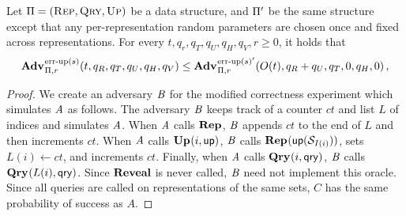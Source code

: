 \begin{lemma}[]\label{lemma:immutabletomutablenew}
  Let $\mathrm{\Pi} = (\textsc{Rep}, \textsc{Qry}, \textsc{Up})$ be a data structure, and $\mathrm{\Pi}'$ be the same structure except that any per-representation random parameters are chosen once and fixed across representations. For every $t, q_r, q_T, q_U, q_H, q_V, r \geq 0$, it holds that
  \[
    \Adv{\errep(s)}_{\struct,r}(t, q_R, q_T, q_U, q_H, q_V) \leq
    \Adv{\errep(s)'}_{\struct,r}(O(t), q_R + q_U, q_T, 0, q_H, 0) \,,
  \]
\end{lemma}
\begin{proof}

We create an adversary $\mathit{B}$ for the modified correctness experiment which simulates $\mathit{A}$ as follows. The adversary $\mathit{B}$ keeps track of a counter $ct$ and list $L$ of indices and simulates $\mathit{A}$. When $\mathit{A}$ calls $\mathbf{Rep}\hspace{0.5pt}$, $\mathit{B}$ appends $ct$ to the end of $L$ and then increments $ct$. When $\mathit{A}$ calls $\mathbf{Up}\hspace{0.5pt}(i,\mathsf{up})$, $\mathit{B}$ calls $\mathbf{Rep}\hspace{0.5pt}(\mathsf{up}(\mathcal{S}_{I(i)}))$, sets $L(i) \gets ct$, and increments $ct$. Finally, when $\mathit{A}$ calls $\mathbf{Qry}\hspace{0.5pt}(i,\mathsf{qry})$, $\mathit{B}$ calls $\mathbf{Qry}\hspace{0.5pt}(L(i),\mathsf{qry})$. Since $\mathbf{Reveal}$ is never called, $\mathit{B}$ need not implement this oracle. Since all queries are called on representations of the same sets, $C$ has the same probability of success as $A$.

\end{proof}




